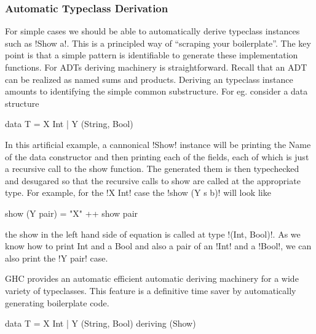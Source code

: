 \documentclass[screen,nonacm,manuscript,review]{acmart} %
\begin{document}
\subsubsection{Automatic Typeclass Derivation}
For simple cases we should be able to automatically derive typeclass
instances such as !Show a!. This is a principled way of ``scraping your
boilerplate''. The key point is that a simple pattern is identifiable
to generate these implementation functions. For ADTs deriving
machinery is straightforward. Recall that an ADT can be realized as
named sums and products. Deriving an typeclass instance amounts to
identifying the simple common substructure. For eg. consider a data
structure

\begin{CenteredBox}
\begin{code}
data T = X Int | Y (String, Bool)
\end{code}
\end{CenteredBox}

In this artificial example, a cannonical !Show! instance will be
printing the Name of the data constructor and then printing each of
the fields, each of which is just a recursive call to the show
function. The generated them is then typechecked and desugared so that
the recursive calls to show are called at the appropriate type.
For example, for the !X Int! case the !show (Y s b)! will look like

\begin{CenteredBox}
\begin{code}
show (Y pair) = "X" ++ show pair
\end{code}
\end{CenteredBox}

the show in the left hand side of equation is called at type
!(Int, Bool)!. As we know how to print Int and a Bool and also a pair of an
!Int! and a !Bool!, we can also print the !Y pair! case.

GHC provides an automatic efficient automatic deriving machinery
for a wide variety of typeclasses. This feature is a definitive time
saver by automatically generating boilerplate code.

\begin{CenteredBox}
\begin{code}
data T = X Int | Y (String, Bool)
                deriving (Show)
\end{code}
\end{CenteredBox}
\end{document}
